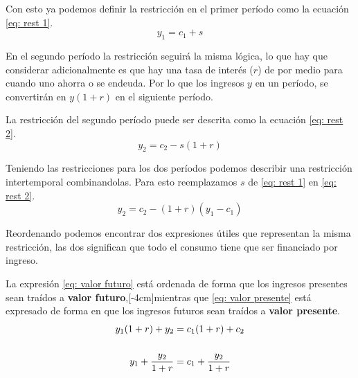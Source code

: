 Con esto ya podemos definir la restricción en el primer período como la ecuación \ref{eq: rest 1}.
\begin{equation}
    y_1 = c_1+s \label{eq: rest 1}
\end{equation}

En el segundo período la restricción seguirá la misma lógica, lo que hay que considerar adicionalmente es que hay una tasa de interés ($r$) de por medio para cuando uno ahorra o se endeuda. Por lo que los ingresos $y$ en un período, se convertirán en $y(1+r)$ en el siguiente período.

La restricción del segundo período puede ser descrita como la ecuación \ref{eq: rest 2}.
\begin{equation}
    y_2 = c_2 - s(1+r) \label{eq: rest 2}
\end{equation}

Teniendo las restricciones para los dos períodos podemos describir una restricción intertemporal combinandolas. Para esto reemplazamos $s$ de \ref{eq: rest 1} en \ref{eq: rest 2}.
\begin{equation*}
    y_2 = c_2 - (1+r)(y_1-c_1) 
\end{equation*}

Reordenando podemos encontrar dos expresiones útiles que representan la misma restricción, las dos significan que todo el consumo tiene que ser financiado por ingreso. 

La expresión \ref{eq: valor futuro} está ordenada de forma que los ingresos presentes sean traídos a \textbf{valor futuro},[-4cm]mientras que \ref{eq: valor presente} está expresado de forma en que los ingresos futuros sean traídos a \textbf{valor presente}.
\begin{align}
    y_1(1+r) + y_2 &= c_1(1+r) + c_2 \label{eq: valor futuro} \\
    \quad & \quad \notag\\
    y_1 + \frac{y_2}{1+r} &= c_1 + \frac{y_2}{1+r} \label{eq: valor presente}
\end{align}

